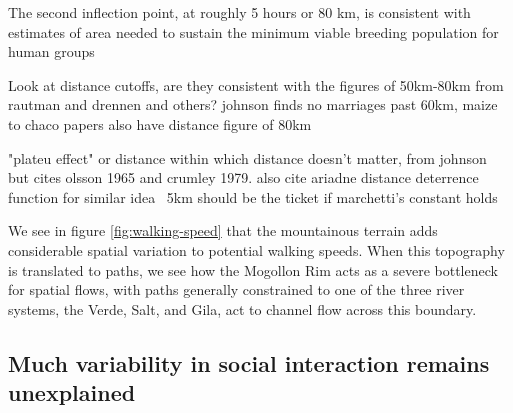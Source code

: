 \documentclass[fleqn,10pt]{wlscirep}
\begin{document}
The second inflection point, at roughly 5 hours or 80 km, is consistent with estimates of area needed to sustain the minimum viable breeding population for human groups


Look at distance cutoffs, are they consistent with the figures of 50km-80km from rautman and drennen and others? johnson finds no marriages past 60km, maize to chaco papers also have distance figure of 80km

"plateu effect" or distance within which distance doesn't matter, from johnson but cites olsson 1965 and crumley 1979. also cite ariadne distance deterrence function for similar idea
~5km should be the ticket if marchetti's constant holds

We see in figure \ref{fig:walking-speed} that the mountainous terrain adds considerable spatial variation to potential walking speeds. When this topography is translated to paths, we see how the Mogollon Rim acts as a severe bottleneck for spatial flows, with paths generally constrained to one of the three river systems, the Verde, Salt, and Gila, act to channel flow across this boundary.  


\subsection*{Much variability in social interaction remains unexplained}
\end{document}
